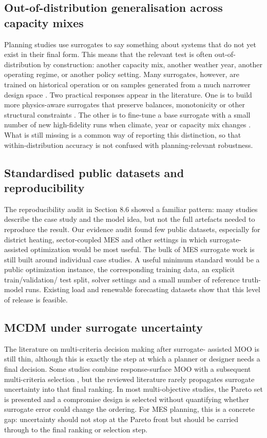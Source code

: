 \documentclass[final,5p,times,twocolumn]{elsarticle}
\begin{document}
\subsection{Out-of-distribution generalisation across capacity mixes}
\label{sec:ch:ood}
Planning studies use surrogates to say something about systems that do
not yet exist in their final form. This means that the relevant test is
often out-of-distribution by construction: another capacity mix, another
weather year, another operating regime, or another policy setting. Many
surrogates, however, are trained on historical operation or on samples
generated from a much narrower design space
\cite{Park2019,Reynolds2017704,Subedi2026157,Khaloie2025,Lim2025,Mylonopoulos202332697}.
Two practical responses appear in the literature. One is to build more
physics-aware surrogates that preserve balances, monotonicity or other
structural constraints
\cite{Park2019,Su2022315,Liu20223726,Petrova2025,Du2025}. The other
is to fine-tune a base surrogate with a small number of new
high-fidelity runs when climate, year or capacity mix changes
\cite{Chen202514792,De Castro20247710}. What is
still missing is a common way of reporting this distinction, so that
within-distribution accuracy is not confused with planning-relevant
robustness.
\subsection{Standardised public datasets and reproducibility}
\label{sec:ch:data}
The reproducibility audit in Section 8.6 showed a familiar pattern:
many studies describe the case study and the model idea, but not the
full artefacts needed to reproduce the result. Our evidence audit found
few public datasets, especially for district heating, sector-coupled MES
and other settings in which surrogate-assisted optimization would be
most useful.
The bulk of MES surrogate work is still built around individual case
studies. A useful minimum standard would be a public optimization
instance, the corresponding training data, an explicit train/validation/
test split, solver settings and a small number of reference truth-model
runs. Existing load and renewable forecasting datasets
\cite{Eseye201991463,Faraji2020157284,Hanifi2024,Sideratos2020,Tian2020,Madhukumar20228891}
show that this level of release is feasible.
\subsection{MCDM under surrogate uncertainty}
\label{sec:ch:mcdm}
The literature on multi-criteria decision making after surrogate-
assisted MOO is still thin, although this is exactly the step at which a
planner or designer needs a final decision. Some studies combine
response-surface MOO with a subsequent multi-criteria selection
\cite{Roy2020}, but the reviewed literature rarely propagates surrogate
uncertainty into that final ranking. In most multi-objective studies,
the Pareto set is presented and a compromise design is selected without
quantifying whether surrogate error could change the ordering.
For MES planning, this is a concrete gap: uncertainty should not stop at
the Pareto front but should be carried through to the final ranking or
selection step.
\end{document}
